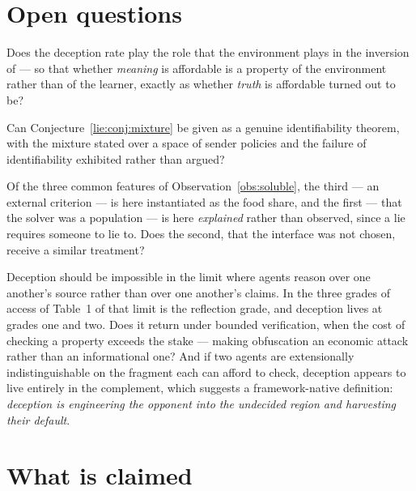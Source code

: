 \section{Open questions}
\label{sec:lie-open}

\begin{question}
Does the deception rate play the role that the environment plays in the
inversion of \chComp --- so that whether \emph{meaning} is affordable is a
property of the environment rather than of the learner, exactly as whether
\emph{truth} is affordable turned out to be?
\end{question}

\begin{question}
Can Conjecture~\ref{lie:conj:mixture} be given as a genuine identifiability
theorem, with the mixture stated over a space of sender policies and the failure
of identifiability exhibited rather than argued?
\end{question}

\begin{question}
Of the three common features of Observation~\ref{obs:soluble}, the third --- an
external criterion --- is here instantiated as the food share, and the first ---
that the solver was a population --- is here \emph{explained} rather than
observed, since a lie requires someone to lie to. Does the second, that the
interface was not chosen, receive a similar treatment?
\end{question}

\begin{question}
Deception should be impossible in the limit where agents reason over one
another's source rather than over one another's claims. In the three grades of
access of Table~1 of \chSci that limit is the reflection grade, and deception
lives at grades one and two. Does it return under bounded verification, when the
cost of checking a property exceeds the stake --- making obfuscation an economic
attack rather than an informational one? And if two agents are extensionally
indistinguishable on the fragment each can afford to check, deception appears to
live entirely in the complement, which suggests a framework-native definition:
\emph{deception is engineering the opponent into the undecided region and
harvesting their default}.
\end{question}

\section{What is claimed}
\label{sec:lie-claimed}

